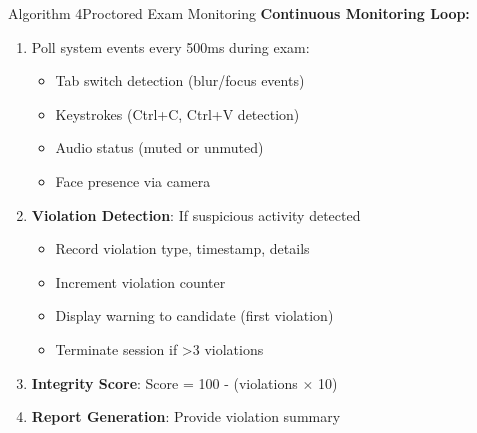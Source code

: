 \documentclass{beamer}
\begin{document}
\begin{frame}{Algorithm 4}{Proctored Exam Monitoring}
\textbf{Continuous Monitoring Loop:}
\begin{enumerate}
    \item Poll system events every 500ms during exam:
    \begin{itemize}
        \item Tab switch detection (blur/focus events)
        \item Keystrokes (Ctrl+C, Ctrl+V detection)
        \item Audio status (muted or unmuted)
        \item Face presence via camera
    \end{itemize}
    \item \textbf{Violation Detection}: If suspicious activity detected
    \begin{itemize}
        \item Record violation type, timestamp, details
        \item Increment violation counter
        \item Display warning to candidate (first violation)
        \item Terminate session if >3 violations
    \end{itemize}
    \item \textbf{Integrity Score}: Score = 100 - (violations $\times$ 10)
    \item \textbf{Report Generation}: Provide violation summary
\end{enumerate}
\end{frame}
\end{document}

